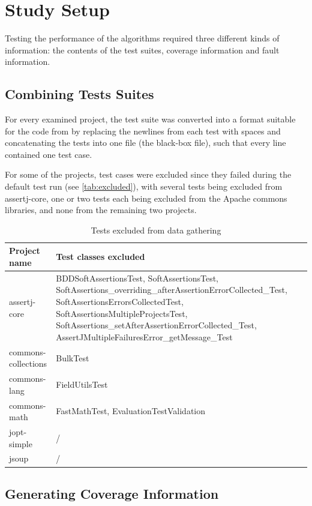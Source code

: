 \section{Study Setup}

Testing the performance of the algorithms required three different kinds
of information: the contents of the test suites, coverage information
and fault information.

\subsection{Combining Tests Suites}

For every examined project, the test suite was converted into a format
suitable for the code from \cite{cruciani2019scalable} by replacing the
newlines from each test with spaces and concatenating the tests into one
file (the black-box file), such that every line contained one test case.

For some of the projects, test cases were excluded since they failed
during the default test run (see \autoref{tab:excluded}), with several
tests being excluded from assertj-core, one or two tests each being
excluded from the Apache commons libraries, and none from the remaining
two projects.

\begin{table}[htpb]
	\caption[Tests excluded]{Tests excluded from data gathering}\label{tab:excluded}
	\centering
	\begin{tabular}{l | p{10cm}}
		\toprule
		Project name & Test classes excluded \\
		\midrule
		assertj-core & BDDSoftAssertionsTest, SoftAssertionsTest, SoftAssertions\_overriding\_afterAssertionErrorCollected\_Test, SoftAssertionsErrorsCollectedTest, SoftAssertionsMultipleProjectsTest, SoftAssertions\_setAfterAssertionErrorCollected\_Test, AssertJMultipleFailuresError\_getMessage\_Test \\
		commons-collections & BulkTest \\
		commons-lang & FieldUtilsTest \\
		commons-math & FastMathTest, EvaluationTestValidation \\
		jopt-simple & / \\
		jsoup & / \\
		\bottomrule
	\end{tabular}
\end{table}

\subsection{Generating Coverage Information}

